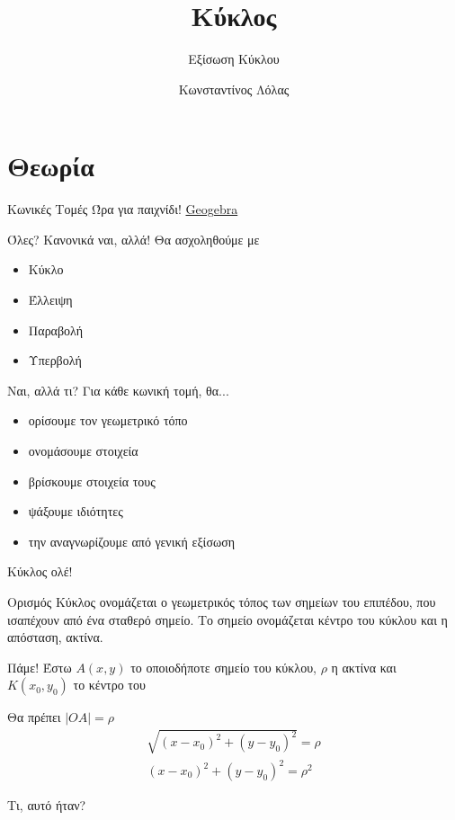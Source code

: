 \documentclass[greek]{beamer}
\title{Κύκλος}
\subtitle{Εξίσωση Κύκλου}
\author[Λόλας]{Κωνσταντίνος Λόλας}
\date{}
\begin{document}
\begin{frame}
  \titlepage
\end{frame}

\section{Θεωρία}
\begin{frame}{Κωνικές Τομές}
  Ώρα για παιχνίδι!
  \href{https://www.geogebra.org/m/pCg8NFVT}{Geogebra}
\end{frame}

\begin{frame}{Όλες? Κανονικά ναι, αλλά!}
  Θα ασχοληθούμε με
  \begin{itemize}
    \item Κύκλο
    \item Έλλειψη
    \item Παραβολή
    \item Υπερβολή
  \end{itemize}
\end{frame}

\begin{frame}{Ναι, αλλά τι?}
  Για κάθε κωνική τομή, θα...
  \begin{itemize}
    \item<1-> ορίσουμε τον γεωμετρικό τόπο
    \item<2-> ονομάσουμε στοιχεία
    \item<3-> βρίσκουμε στοιχεία τους
    \item<4-> ψάξουμε ιδιότητες
    \item<5-> την αναγνωρίζουμε από γενική εξίσωση
  \end{itemize}
\end{frame}

\begin{frame}{Κύκλος ολέ!}
  \begin{block}{Ορισμός}
    Κύκλος ονομάζεται ο γεωμετρικός τόπος των σημείων του επιπέδου, που ισαπέχουν από ένα σταθερό σημείο. Το σημείο ονομάζεται κέντρο του κύκλου και η απόσταση, ακτίνα.
  \end{block}
\end{frame}

\begin{frame}{Πάμε!}
   Έστω $A(x,y)$ το οποιοδήποτε σημείο του κύκλου, $ρ$ η ακτίνα και $Κ(x_0,y_0)$ το κέντρο του

   Θα πρέπει $|ΟΑ|=ρ$
  \begin{align*}
    \sqrt{(x-x_0)^2+(y-y_0)^2}=ρ \\
    (x-x_0)^2+(y-y_0)^2=ρ^2
  \end{align*}

   Τι, αυτό ήταν?

\end{frame}
\end{document}
